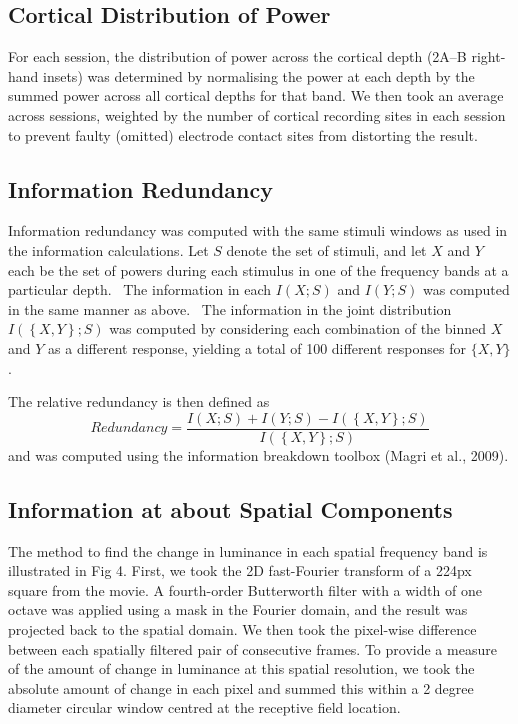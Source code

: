 \subsection[Cortical Distribution of Power]{Cortical Distribution of Power}
For each session, the distribution of power across the cortical depth (2A--B right-hand insets) was determined by normalising the power at each depth by the summed power across all cortical depths for that band. We then took an average across sessions, weighted by the number of cortical recording sites in each session to prevent faulty (omitted) electrode contact sites from distorting the result.

\subsection{Information Redundancy }
Information redundancy was computed with the same stimuli windows as used in the information calculations. Let  $S$ denote the set of stimuli, and let  $X$ and  $Y$ each be the set of powers during each stimulus in one of the frequency bands at a particular depth. \ The information in each  $I\left(X;S\right)$ and  $I(Y;S)$ was computed in the same manner as above. \ The information in the joint distribution  $I(\left\{X,Y\right\};S)$ was computed by considering each combination of the binned  $X$ and  $Y$ as a different response, yielding a total of 100 different responses for  $\{X,Y\}$.

The relative redundancy is then defined as
\begin{equation*}
\mathit{Redundancy}=\frac{I\left(X;S\right)+I\left(Y;S\right)-I\left(\left\{X,Y\right\};S\right)}{I\left(\left\{X,Y\right\};S\right)}
\end{equation*}
and was computed using the information breakdown toolbox (Magri et al., 2009). 

\subsection{Information at about Spatial Components}
The method to find the change in luminance in each spatial frequency band is illustrated in Fig 4. First, we took the 2D fast-Fourier transform of a 224px square from the movie. A fourth-order Butterworth filter with a width of one octave was applied using a mask in the Fourier domain, and the result was projected back to the spatial domain. We then took the pixel-wise difference between each spatially filtered pair of consecutive frames. To provide a measure of the amount of change in luminance at this spatial resolution, we took the absolute amount of change in each pixel and summed this within a 2 degree diameter circular window centred at the receptive field location.

